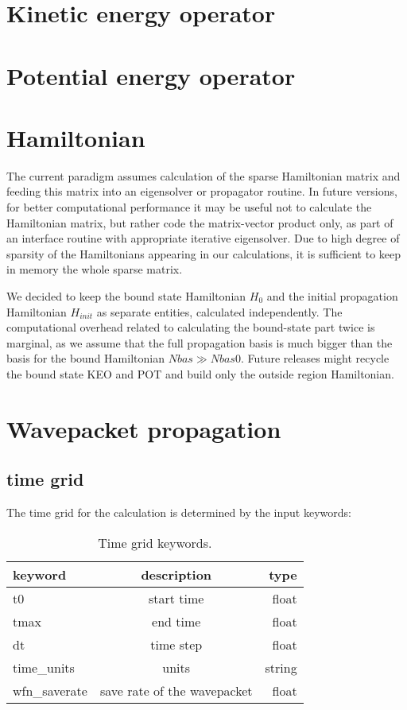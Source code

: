 \documentclass[a4paper,american,floatfix,pdftex,superscriptaddress,twoside,%
aps,pra,
linenumbers,%
reprint,%
]{revtex4-2}%
\begin{document}
\section{Kinetic energy operator}
\label{sec:keo}


\section{Potential energy operator}



\section{Hamiltonian}
The current paradigm assumes calculation of the sparse Hamiltonian matrix and feeding this matrix into an eigensolver or propagator routine. In future versions, for better computational performance it may be useful not to calculate the Hamiltonian matrix, but rather code the matrix-vector product only, as part of an interface routine with appropriate iterative eigensolver.
Due to high degree of sparsity of the Hamiltonians appearing in our calculations, it is sufficient to keep in memory the whole sparse matrix.

We decided to keep the bound state Hamiltonian $H_0$ and the initial propagation Hamiltonian $H_{init}$ as separate entities, calculated independently. The computational overhead related to calculating the bound-state part twice is marginal, as we assume that the full propagation basis is much bigger than the basis for the bound Hamiltonian $Nbas \gg Nbas0$. Future releases might recycle the bound state KEO and POT and build only the outside region Hamiltonian.

\section{Wavepacket propagation}
\subsection{time grid}
The time grid for the calculation is determined by the input keywords:
\begin{table}[h!]
	\begin{center}
		\caption{Time grid keywords.}
		\label{tab:time-grids}
		\begin{tabular}{l|c|r}
			\textbf{keyword} & \textbf{description} & \textbf{type}\\
			\hline
			t0 & start time & float\\
			tmax & end time & float\\
			dt & time step & float\\
			time\_units & units & string \\
			wfn\_saverate & save rate of the wavepacket  & float \\
			
		\end{tabular}
	\end{center}
\end{table}
\end{document}
